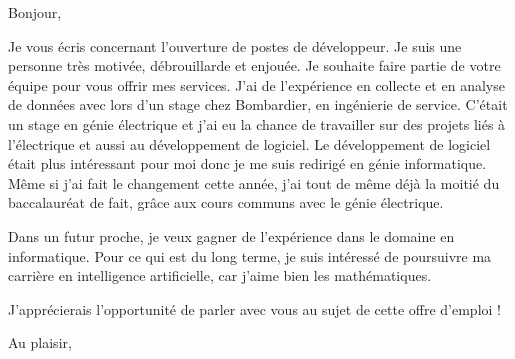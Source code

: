 \documentclass[12pt,french]{letter}
\begin{document}
\pagestyle{headings}

\begin{letter}{}
\address{Montréal, Canada}

\opening{Bonjour,}


Je vous écris concernant l'ouverture de postes de développeur.
Je suis une personne très motivée, débrouillarde et enjouée. Je souhaite faire partie de votre équipe pour vous offrir mes services. 
J'ai de l'expérience en collecte et en analyse de données avec lors d'un stage chez Bombardier, en ingénierie de service. C'était un stage en génie électrique et j'ai eu la chance de travailler sur des projets liés à l'électrique et aussi au développement de logiciel. Le développement de logiciel était plus intéressant pour moi donc je me suis redirigé en génie informatique. Même si j'ai fait le changement cette année, j'ai tout de même déjà la moitié du baccalauréat de fait, grâce aux cours communs avec le génie électrique.

Dans un futur proche, je veux gagner de l'expérience dans le domaine en informatique. Pour ce qui est du long terme, je suis intéressé de poursuivre ma carrière en intelligence artificielle, car j'aime bien les mathématiques.

J'apprécierais l'opportunité de parler avec vous au sujet de cette offre d'emploi !
\signature{Maxime}

\closing{Au plaisir,}


\end{letter}
\end{document}
